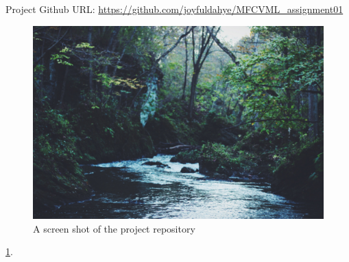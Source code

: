 \documentclass[fleqn,10pt]{wlscirep}
\begin{document}
Project Github URL: \url{https://github.com/joyfuldahye/MFCVML_assignment01}

\begin{figure}[ht]
\centering
\includegraphics[width=\linewidth]{stream}
\caption{A screen shot of the project repository}
\label{fig:stream}
\end{figure}

 \ref{fig:stream}.
\end{document}
